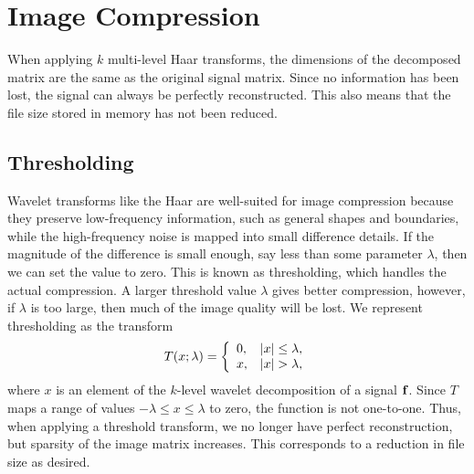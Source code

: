 \documentclass{article}
\theoremstyle{definition}
\renewenvironment{cases}{
  \left\{
    \begin{array}{ll}
}{
    \end{array}
  \right.
}
\begin{document}

  \section{Image Compression}

  When applying \(k\) multi-level Haar transforms, the dimensions of the decomposed matrix are the same as the original signal matrix. Since no information has been lost, the signal can always be perfectly reconstructed. This also means that the file size stored in memory has not been reduced.
  
  \subsection{Thresholding}
  Wavelet transforms like the Haar are well-suited for image compression because they preserve low-frequency information, such as general shapes and boundaries, while the high-frequency noise is mapped into small difference details. If the magnitude of the difference is small enough, say less than some parameter \(\lambda\), then we can set the value to zero. This is known as thresholding, which handles the actual compression. A larger threshold value \(\lambda\) gives better compression, however, if \(\lambda\) is too large, then much of the image quality will be lost.
  We represent thresholding as the transform
  \begin{equation} \label{eqn:threshold}
    T(x;\lambda) = \begin{cases}
      0, & |x| \leq \lambda,\\
      x, & |x| > \lambda,
    \end{cases}
  \end{equation}
  where \(x\) is an element of the \(k\)-level wavelet decomposition of a signal \(\vb{f}\). Since \(T\) maps a range of values \(- \lambda \leq x \leq \lambda\) to zero, the function is not one-to-one. Thus, when applying a threshold transform, we no longer have perfect reconstruction, but sparsity of the image matrix increases. This corresponds to a reduction in file size as desired.
\end{document}
